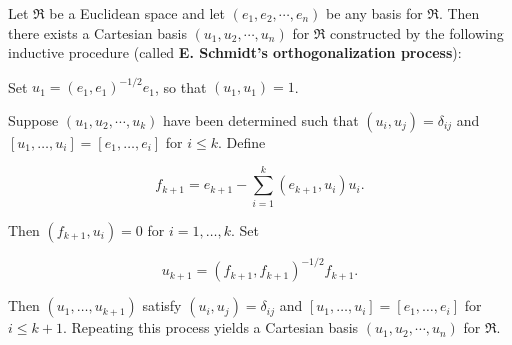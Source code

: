 Let $\Re$ be a Euclidean space and let $(e_1, e_2, \cdots, e_n)$ be any basis for $\Re$. Then there exists a Cartesian basis $(u_1, u_2, \cdots, u_n)$ for $\Re$ constructed by the following inductive procedure (called \textbf{E. Schmidt's orthogonalization process}):

Set $u_1 = (e_1, e_1)^{-1/2} e_1$, so that $(u_1, u_1) = 1$.

Suppose $(u_1, u_2, \cdots, u_k)$ have been determined such that $(u_i, u_j) = \delta_{ij}$ and $[u_1, \ldots, u_i] = [e_1, \ldots, e_i]$ for $i \leq k$. Define

$$f_{k+1} = e_{k+1} - \sum_{i=1}^{k} (e_{k+1}, u_i) u_i.$$

Then $(f_{k+1}, u_i) = 0$ for $i = 1, \ldots, k$. Set

$$u_{k+1} = (f_{k+1}, f_{k+1})^{-1/2} f_{k+1}.$$

Then $(u_1, \ldots, u_{k+1})$ satisfy $(u_i, u_j) = \delta_{ij}$ and $[u_1, \ldots, u_i] = [e_1, \ldots, e_i]$ for $i \leq k+1$. Repeating this process yields a Cartesian basis $(u_1, u_2, \cdots, u_n)$ for $\Re$.
